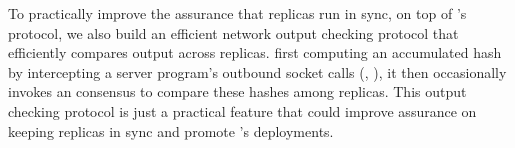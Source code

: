 To practically improve the assurance that replicas run in sync, on top of
\xxx's \paxos protocol, we also build an efficient network output checking
protocol that efficiently compares output across replicas. first computing an
accumulated hash by intercepting a server program's outbound socket calls (\eg,
\send), it then occasionally invokes an consensus to compare these hashes among
replicas. This output checking protocol is just a practical feature that could
improve assurance on keeping replicas in sync and promote \xxx's deployments.




%



